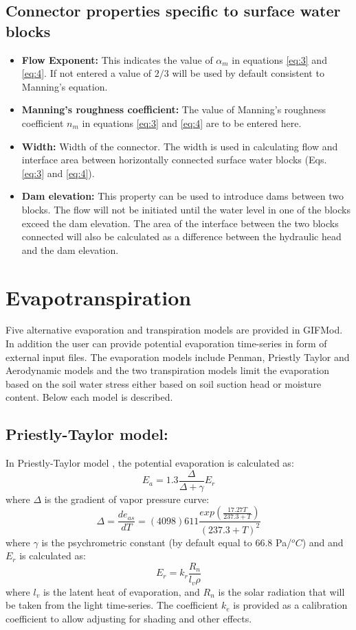 \subsection{Connector properties specific to surface water blocks}
\begin{itemize}
\item \textbf{Flow Exponent: } This indicates the value of $\alpha_m$ in equations \ref{eq:3} and \ref{eq:4}. If not entered a value of $2/3$ will be used by default consistent to Manning's equation. 
\item \textbf{Manning's roughness coefficient: } The value of Manning's roughness coefficient $n_m$ in equations \ref{eq:3} and \ref{eq:4} are to be entered here.
\item \textbf{Width: } Width of the connector. The width is used in calculating flow and interface area between horizontally connected surface water blocks (Eqs. \ref{eq:3} and \ref{eq:4}). 
\item \textbf{Dam elevation: } This property can be used to introduce dams between two blocks. The flow will not be initiated until the water level in one of the blocks exceed the dam elevation. The area of the interface between the two blocks connected will also be calculated as a difference between the hydraulic head and the dam elevation.  
\end{itemize}
\section{Evapotranspiration}\label{section:3.3}
Five alternative evaporation and transpiration models are provided in GIFMod. In addition the user can provide potential evaporation time-series in form of external input files. The evaporation models include Penman, Priestly Taylor and Aerodynamic models and the two transpiration models limit the evaporation based on the soil water stress either based on soil suction head or moisture content. Below each model is described. 
\subsection{Priestly-Taylor model: }
In Priestly-Taylor model \citep{Priestley1972}, the potential evaporation is calculated as:
\begin{equation}
\label{eq:13}
E_a = 1.3\frac{\Delta}{\Delta+\gamma}E_r 
\end{equation}
where $\Delta$ is the gradient of vapor pressure curve:
\begin{equation}
\label{eq:14}
\Delta = \frac{d e_{as}}{dT} = (4098)611\frac{exp(\frac{17.27T}{237.3+T})}{(237.3+T)^2} 
\end{equation}
where $\gamma$ is the psychrometric constant (by default equal to 66.8 Pa/$^oC$) and and $E_r$ is calculated as:
\begin{equation}
\label{eq:15}
E_r = k_r\frac{R_n}{l_v \rho}
\end{equation}
where $l_v$ is the latent heat of evaporation, and $R_n$ is the solar radiation that will be taken from the light time-series. The coefficient $k_e$ is provided as a calibration coefficient to allow adjusting for shading and other effects. 

